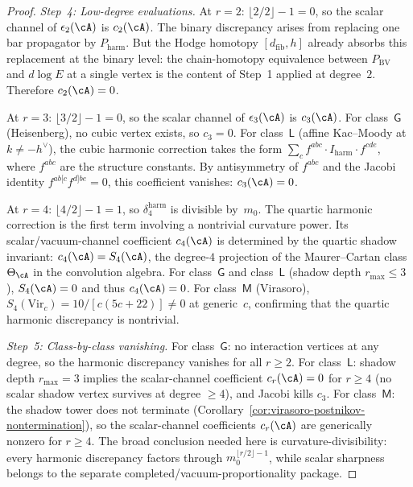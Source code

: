 \begin{proof}
\emph{Step~4: Low-degree evaluations.}
At $r = 2$: $\lfloor 2/2 \rfloor - 1 = 0$, so the scalar
channel of $\epsilon_2(\cA)$ is $c_2(\cA)$.
The binary discrepancy arises from replacing one bar
propagator by $P_{\mathrm{harm}}$. But the Hodge homotopy
$[d_{\mathrm{fib}}, h]$ already absorbs this replacement
at the binary level: the chain-homotopy equivalence between
$P_{\mathrm{BV}}$ and $d\log E$ at a single vertex
is the content of Step~1 applied at degree~$2$. Therefore
$c_2(\cA) = 0$.

At $r = 3$: $\lfloor 3/2 \rfloor - 1 = 0$, so the scalar
channel of $\epsilon_3(\cA)$ is $c_3(\cA)$.
For class~$\mathsf{G}$ \textup{(}Heisenberg\textup{)},
no cubic vertex exists, so $c_3 = 0$.
For class~$\mathsf{L}$ \textup{(}affine Kac--Moody at
$k \neq -h^\vee$\textup{)}, the cubic harmonic correction
takes the form
$\sum_c f^{abc} \cdot I_{\mathrm{harm}} \cdot f^{cde}$,
where $f^{abc}$ are the structure constants. By
antisymmetry of $f^{abc}$ and the Jacobi identity
$f^{ab[c}f^{d]be} = 0$, this coefficient vanishes:
$c_3(\cA) = 0$.

At $r = 4$: $\lfloor 4/2 \rfloor - 1 = 1$, so
$\delta_4^{\mathrm{harm}}$ is divisible by~$m_0$. The quartic
harmonic correction is the first term involving a nontrivial
curvature power. Its scalar/vacuum-channel coefficient
$c_4(\cA)$ is determined by the quartic shadow
invariant: $c_4(\cA) = S_4(\cA)$, the degree-$4$
projection of the Maurer--Cartan class
$\Theta_\cA$ in the convolution algebra.
For class~$\mathsf{G}$ and class~$\mathsf{L}$
\textup{(}shadow depth $r_{\max} \leq 3$\textup{)},
$S_4(\cA) = 0$ and thus $c_4(\cA) = 0$.
For class~$\mathsf{M}$ \textup{(}Virasoro\textup{)},
$S_4(\mathrm{Vir}_c) = 10/[c(5c+22)] \neq 0$
at generic~$c$, confirming that the quartic harmonic
discrepancy is nontrivial.

\emph{Step~5: Class-by-class vanishing.}
For class~$\mathsf{G}$: no interaction vertices at
any degree, so the harmonic discrepancy vanishes for all
$r \geq 2$.
For class~$\mathsf{L}$: shadow depth $r_{\max} = 3$
implies the scalar-channel coefficient $c_r(\cA) = 0$ for $r \geq 4$
\textup{(}no scalar shadow vertex survives at degree
$\geq 4$\textup{)}, and Jacobi kills $c_3$.
For class~$\mathsf{M}$: the shadow tower does not
terminate \textup{(}Corollary~\ref{cor:virasoro-postnikov-nontermination}\textup{)},
so the scalar-channel coefficients $c_r(\cA)$ are generically
nonzero for $r \geq 4$. The broad conclusion needed here is
curvature-divisibility: every harmonic discrepancy factors through
$m_0^{\lfloor r/2 \rfloor - 1}$, while scalar sharpness belongs to
the separate completed/vacuum-proportionality package.
\end{proof}

